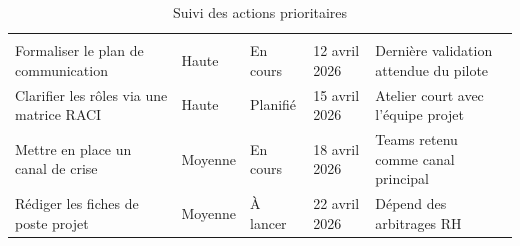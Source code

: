 \documentclass[11pt, a4paper]{article}
\begin{document}
\clearpage

\begin{table}[H]
\centering
\CERTableStyle
\caption{Suivi des actions prioritaires}
\label{tab:sample-actions}
\begin{tabularx}{\textwidth}{Y C{2.2cm} C{2.2cm} C{2.4cm} Y}
\toprule
{} &  &  &  &  \\
Formaliser le plan de communication & Haute & En cours & 12 avril 2026 & Derni\`ere validation attendue du pilote \\
Clarifier les r\^oles via une matrice RACI & Haute & Planifi\'e & 15 avril 2026 & Atelier court avec l'\'equipe projet \\
Mettre en place un canal de crise & Moyenne & En cours & 18 avril 2026 & Teams retenu comme canal principal \\
R\'ediger les fiches de poste projet & Moyenne & \`A lancer & 22 avril 2026 & D\'epend des arbitrages RH \\
\bottomrule
\end{tabularx}
\end{table}
\end{document}
